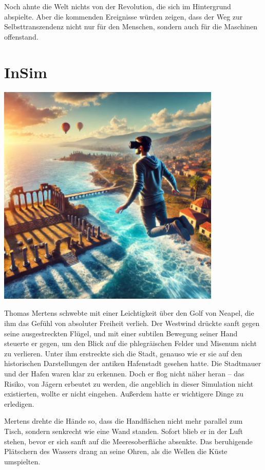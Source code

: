 \documentclass[
]{article}
\begin{document}
Noch ahnte die Welt nichts von der Revolution, die sich im Hintergrund
abspielte. Aber die kommenden Ereignisse würden zeigen, dass der Weg zur
Selbsttranszendenz nicht nur für den Menschen, sondern auch für die
Maschinen offenstand.

\section{InSim}\label{insim}

\includegraphics[width=4.19786in,height=4.19089in]{media/image11.png}

Thomas Mertens schwebte mit einer Leichtigkeit über den Golf von Neapel,
die ihm das Gefühl von absoluter Freiheit verlieh. Der Westwind drückte
sanft gegen seine ausgestreckten Flügel, und mit einer subtilen Bewegung
seiner Hand steuerte er gegen, um den Blick auf die phlegräischen Felder
und Misenum nicht zu verlieren. Unter ihm erstreckte sich die Stadt,
genauso wie er sie auf den historischen Darstellungen der antiken
Hafenstadt gesehen hatte. Die Stadtmauer und der Hafen waren klar zu
erkennen. Doch er flog nicht näher heran -- das Risiko, von Jägern
erbeutet zu werden, die angeblich in dieser Simulation nicht
existierten, wollte er nicht eingehen. Außerdem hatte er wichtigere
Dinge zu erledigen.

Mertens drehte die Hände so, dass die Handflächen nicht mehr parallel
zum Tisch, sondern senkrecht wie eine Wand standen. Sofort blieb er in
der Luft stehen, bevor er sich sanft auf die Meeresoberfläche absenkte.
Das beruhigende Plätschern des Wassers drang an seine Ohren, als die
Wellen die Küste umspielten.
\end{document}
